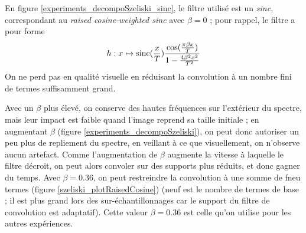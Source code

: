 	
	En figure \ref{experiments_decompoSzeliski_sinc}, le filtre utilisé est un \emph{sinc}, correspondant au \emph{raised cosine-weighted sinc} avec $\beta = 0$ ; pour rappel, le filtre a pour forme
	\[h : x \mapsto \operatorname{sinc}(\frac{x}{T})\frac{\cos(\frac{\pi\beta x}{T})}{1-\frac{4\beta^2x^2}{T^2}}\]
	On ne perd pas en qualité visuelle en réduisant la convolution à un nombre fini de termes suffisamment grand.
	
	Avec un $\beta$ plus élevé, on conserve des hautes fréquences sur l'extérieur du spectre, mais leur impact est faible quand l'image reprend sa taille initiale ; en augmentant $\beta$ (figure \ref{experiments_decompoSzeliski}), on peut donc autoriser un peu plus de repliement du spectre, en veillant à ce que visuellement, on n'observe aucun artefact. Comme l'augmentation de $\beta$ augmente la vitesse à laquelle le filtre décroit, on peut alors convoler sur des supports plus réduits, et donc gagner du temps. Avec $\beta = 0.36$, on peut restreindre la convolution à une somme de fneu termes (figure \ref{szeliski_plotRaisedCosine}) (neuf est le nombre de termes de base ; il est plus grand lors des sur-échantillonnages car le support du filtre de convolution est adaptatif). Cette valeur $\beta = 0.36$ est celle qu'on utilise pour les autres expériences.
 
